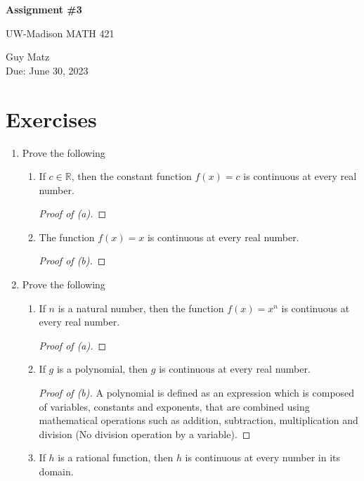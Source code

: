 \documentclass{article} %
\theoremstyle{plain}
\theoremstyle{definition}
\theoremstyle{case}
\newcommand{\Rb}{\mathbb{R}}
\begin{document}
\begin{center}
\Large{\textbf{Assignment \#3}
            
UW-Madison MATH 421} %
\vspace{5pt}
        
\normalsize{  Guy Matz%
        \\ Due: June 30, 2023}
\vspace{15pt}
\end{center}

\section*{Exercises}%
\begin{enumerate}[label={\fbox{\textbf{Exercise \#\arabic* :}}}]
  \item Prove the following
    \begin{enumerate}
      \item If $c \in \Rb$, then the constant function $f(x) =c$ is continuous at every real number.
        \begin{proof}[Proof of (a)]
        \end{proof}
      \item The function $f(x) = x$ is continuous at every real number.
        \begin{proof}[Proof of (b)]
        \end{proof}
    \end{enumerate}



\newpage

\item Prove the following
  \begin{enumerate}
    \item If $n$ is a natural number, then the function $f(x) = x^n$ is
      continuous at every real number.
      \begin{proof}[Proof of (a)]
      \end{proof}

    \item If $g$ is a polynomial, then $g$ is continuous at every real number.
      \begin{proof}[Proof of (b)]
      A polynomial is defined as an expression which is composed of variables, constants and exponents, that are combined using mathematical operations such as addition, subtraction, multiplication and division (No division operation by a variable).
      \end{proof}
    \item If $h$ is a rational function, then $h$ is continuous at every number in its domain.


\end{enumerate}
\end{enumerate}
\end{document}
